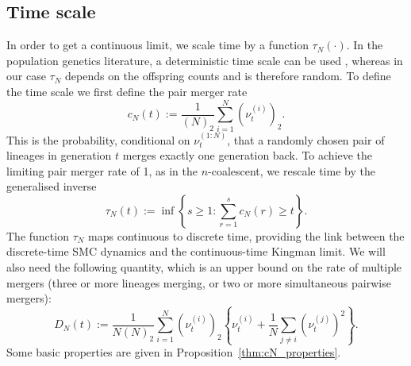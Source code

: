 \subsection{Time scale \seb{$\checkmark$} }
In order to get a continuous limit, we scale time by a function $\tau_N(\cdot)$. In the population genetics literature, a deterministic time scale can be used , whereas in our case $\tau_N$ depends on the offspring counts and is therefore random.
To define the time scale we first define the pair merger rate
\begin{equation}\label{eq:defn_cN}
c_N(t) := \frac{1}{(N)_2} \sum_{i=1}^N (\nu_t^{(i)})_2 .
\end{equation}
This is the probability, conditional on $\nu_t^{(1:N)}$, that a randomly chosen pair of lineages in generation $t$ merges exactly one generation back.
To achieve the limiting pair merger rate of 1, as in the $n$-coalescent, we rescale time by the generalised inverse
\begin{equation}\label{eq:defn_tauN}
\tau_N(t) := \inf \left\{ s \geq 1 : \sum_{r=1}^s c_N(r) \geq t \right\} .
\end{equation}
The function $\tau_N$ maps continuous to discrete time, providing the link between the discrete-time SMC dynamics and the continuous-time Kingman limit.
We will also need the following quantity, which is an upper bound on the rate of multiple mergers (three or more lineages merging, or two or more simultaneous pairwise mergers):
\begin{equation}\label{eq:defn_DN}
D_N(t) := \frac{1}{N(N)_2} \sum_{i=1}^N (\nu_t^{(i)})_2
        \left\{ \nu_t^{(i)} + \frac{1}{N} \sum_{j\neq i} (\nu_t^{(j)})^2 \right\} .
\end{equation} 
Some basic properties are given in Proposition~\ref{thm:cN_properties}.
